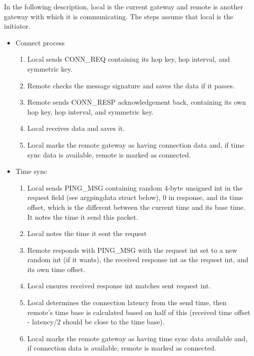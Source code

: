 \par In the following description, local is the current gateway and remote is another gateway with which it is communicating. The steps assume that local is the initiator.

\begin{itemize}
\item Connect process
	\begin{enumerate}
		\item Local sends CONN\_REQ containing its hop key, hop interval, and symmetric key. 
		\item Remote checks the message signature and saves the data if it passes.
		\item Remote sends CONN\_RESP acknowledgement back, containing its own hop key, hop interval, and symmetric key. 
		\item Local receives data and saves it.
		\item Local marks the remote gateway as having connection data and, if time sync data is available, remote is marked as connected. 
	\end{enumerate}

\item Time sync
	\begin{enumerate}
		\item Local sends PING\_MSG containing random 4-byte unsigned int in the request field (see argpingdata struct below), 0 in response, and its time offset, which is the different between the current time and its base time. It notes the time it send this packet. 
		\item Local notes the time it sent the request
		\item Remote responds with PING\_MSG with the request int set to a new random int (if it wants), the received response int as the request int, and its own time offset.
		\item Local ensures received response int matches sent request int.
		\item Local determines the connection latency from the send time, then remote's time base is calculated based on half of this (received time offset - latency/2 should be close to the time base).
		\item Local marks the remote gateway as having time sync data available and, if connection data is available, remote is marked as connected. 
	\end{enumerate}


\end{itemize}
